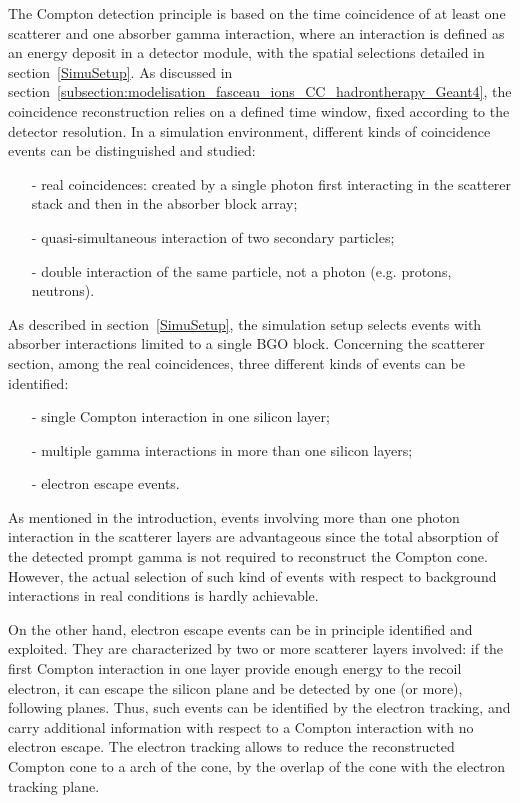 The Compton detection principle is based on the time coincidence of at least one scatterer and one absorber gamma interaction, where an interaction is defined as an energy deposit in a detector module, with the spatial selections detailed in section~\ref{SimuSetup}. As discussed in section~\ref{subsection:modelisation_fasceau_ions_CC_hadrontherapy_Geant4}, the coincidence reconstruction relies on a defined time window, fixed according to the detector resolution. In a simulation environment, different kinds of coincidence events can be distinguished and studied: 
\begin{itemize}
\item[-] real coincidences: created by a single photon first interacting in the scatterer stack and then in the absorber block array;
\item[-] quasi-simultaneous interaction of two secondary particles;
\item[-] double interaction of the same particle, not a photon (e.g. protons, neutrons).
\end{itemize}
As described in section~\ref{SimuSetup}, the simulation setup selects events with absorber interactions limited to a single BGO block.
Concerning the scatterer section, among the real coincidences, three different kinds of events can be identified:
\begin{itemize}
\item[-] single Compton interaction in one silicon layer;
\item[-] multiple gamma interactions in more than one silicon layers;
\item[-] electron escape events.
\end{itemize}
As mentioned in the introduction, events involving more than one photon interaction in the scatterer layers are advantageous since the total absorption of the detected prompt gamma is not required to reconstruct the Compton cone. However, the actual selection of such kind of events with respect to background interactions in real conditions is hardly achievable.

On the other hand, electron escape events can be in principle identified and exploited. They are characterized by two or more scatterer layers involved: if the first Compton interaction in one layer provide enough energy to the recoil electron, it can escape the silicon plane and be detected by one (or more), following planes. Thus, such events can be identified by the electron tracking, and carry additional information with respect to a Compton interaction with no electron escape. The electron tracking allows to reduce the reconstructed Compton cone to a arch of the cone, by the overlap of the cone with the electron tracking plane.      

